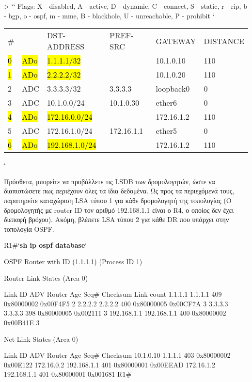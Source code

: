 \documentclass{EdipyLabs} %
\begin{document}
\begin{CommandBox}
[admin@R3] > ``
Flags: X - disabled, A - active, D - dynamic, C - connect, S - static, r - rip, 
b - bgp, o - ospf, m - mme, B - blackhole, U - unreachable, P - prohibit
`\begin{tabular}{llllll}
	\# &     &DST-ADDRESS        &PREF-SRC        &GATEWAY            &DISTANCE\\
	\hl{0} &\hl{ADo}  &\hl{1.1.1.1/32}           &              &10.1.0.10               &110\\
	\hl{1} &\hl{ADo}  &\hl{2.2.2.2/32}         &                &10.1.0.20              & 110\\
	2& ADC  &3.3.3.3/32         &3.3.3.3         &loopback0               &  0\\
	3 &ADC  &10.1.0.0/24        &10.1.0.30       &ether6                 &   0\\
	\hl{4} &\hl{ADo}  &\hl{172.16.0.0/24}      &                &172.16.1.2              & 110\\
	5 &ADC  &172.16.1.0/24      &172.16.1.1      &ether5                   & 0\\
	\hl{6} &\hl{ADo}  &\hl{192.168.1.0/24}     &                &172.16.1.2              &110
\end{tabular}`
\end{CommandBox} 

Πρόσθετα, μπορείτε να προβάλλετε τις LSDB των δρομολογητών, ώστε να διαπιστώσετε πως περιέχουν όλες τα ίδια δεδομένα. Ως προς τα περιεχόμενά τους, παρατηρείτε καταχώριση LSA τύπου 1 για κάθε δρομολογητή της τοπολογίας (Ο δρομολογητής με router ID τον αριθμό 192.168.1.1 είναι ο R4, ο οποίος δεν έχει διεπαφή βρόχου). Ακόμη, βλέπετε LSA τύπου 2 για κάθε DR που υπάρχει στην τοπολογία OSPF.

\begin{CommandBox}
R1#`\textbf{sh ip ospf database}`

            OSPF Router with ID (1.1.1.1) (Process ID 1)

                Router Link States (Area 0)

Link ID         ADV Router      Age         Seq#       Checksum Link count
1.1.1.1         1.1.1.1         409         0x80000002 0x00F4F5 2
2.2.2.2         2.2.2.2         400         0x80000005 0x00CF7A 3
3.3.3.3         3.3.3.3         398         0x80000005 0x002111 3
192.168.1.1     192.168.1.1     400         0x80000002 0x00B41E 3

                Net Link States (Area 0)

Link ID         ADV Router      Age         Seq#       Checksum
10.1.0.10       1.1.1.1         403         0x80000002 0x00E122
172.16.0.2      192.168.1.1     401         0x80000001 0x00EEAD
172.16.1.2      192.168.1.1     401         0x80000001 0x001681
R1#
\end{CommandBox} 
\end{document}
